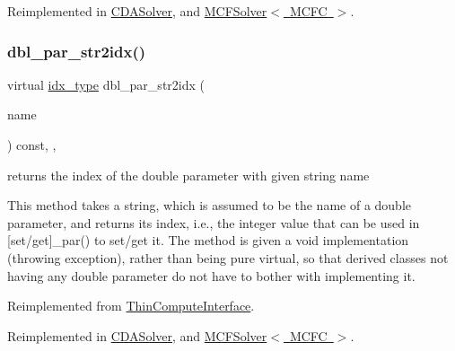 Reimplemented in \mbox{\hyperlink{class_s_m_spp__di__unipi__it_1_1_c_d_a_solver_a93f1297e7910e91cc18b303376191026}{C\+D\+A\+Solver}}, and \mbox{\hyperlink{class_s_m_spp__di__unipi__it_1_1_m_c_f_solver_a93f1297e7910e91cc18b303376191026}{M\+C\+F\+Solver$<$ M\+C\+F\+C $>$}}.

\mbox{\label{class_s_m_spp__di__unipi__it_1_1_solver_a6d353ac3d1200d9bea89235da61bc4f3}} 
\subsubsection{\texorpdfstring{dbl\+\_\+par\+\_\+str2idx()}{dbl\_par\_str2idx()}}
{\footnotesize\ttfamily virtual \mbox{\hyperlink{class_s_m_spp__di__unipi__it_1_1_thin_compute_interface_aa3d710629ad8c434286726ad810c3b47}{idx\+\_\+type}} dbl\+\_\+par\+\_\+str2idx (\begin{DoxyParamCaption}\item[{const std\+::string \&}]{name }\end{DoxyParamCaption}) const\hspace{0.3cm}{\ttfamily [inline]}, {\ttfamily [override]}, {\ttfamily [virtual]}}



returns the index of the double parameter with given string name 

This method takes a string, which is assumed to be the name of a double parameter, and returns its index, i.\+e., the integer value that can be used in \mbox{[}set/get\mbox{]}\+\_\+par() to set/get it. The method is given a void implementation (throwing exception), rather than being pure virtual, so that derived classes not having any double parameter do not have to bother with implementing it. 

Reimplemented from \mbox{\hyperlink{class_s_m_spp__di__unipi__it_1_1_thin_compute_interface_a82f363814aa27e3243ba994a1ed5f39e}{Thin\+Compute\+Interface}}.



Reimplemented in \mbox{\hyperlink{class_s_m_spp__di__unipi__it_1_1_c_d_a_solver_a6d353ac3d1200d9bea89235da61bc4f3}{C\+D\+A\+Solver}}, and \mbox{\hyperlink{class_s_m_spp__di__unipi__it_1_1_m_c_f_solver_a6d353ac3d1200d9bea89235da61bc4f3}{M\+C\+F\+Solver$<$ M\+C\+F\+C $>$}}.

